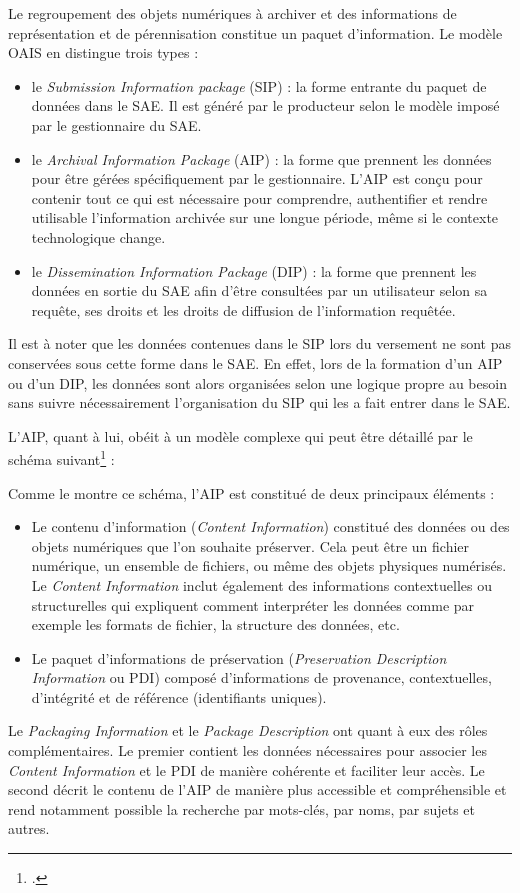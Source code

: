 Le regroupement des objets numériques à archiver et des informations de représentation et de pérennisation constitue un paquet d'information. Le modèle \gls{OAIS} en distingue trois types : 
\begin{itemize}
	\item le \textit{Submission Information package} (\gls{SIP}) : la forme entrante du paquet de données dans le \gls{SAE}. Il est généré par le producteur selon le modèle imposé par le gestionnaire du \gls{SAE}.
	\item le \textit{Archival Information Package} (\gls{AIP}) : la forme que prennent les données pour être gérées spécifiquement par le gestionnaire. L'\gls{AIP} est conçu pour contenir tout ce qui est nécessaire pour comprendre, authentifier et rendre utilisable l'information archivée sur une longue période, même si le contexte technologique change.
	\item le \textit{Dissemination Information Package} (\gls{DIP}) : la forme que prennent les données en sortie du \gls{SAE} afin d’être consultées par un utilisateur selon sa requête, ses droits et les droits de diffusion de l’information requêtée.
\end{itemize}


Il est à noter que les données contenues dans le \gls{SIP} lors du versement ne sont pas conservées sous cette forme dans le \gls{SAE}. En effet, lors de la formation d’un \gls{AIP} ou d’un \gls{DIP}, les données sont alors organisées selon une logique propre au besoin sans suivre nécessairement l’organisation du \gls{SIP} qui les a fait entrer dans le \gls{SAE}. 


L’\gls{AIP}, quant à lui, obéit à un modèle complexe qui peut être détaillé par le schéma suivant\footcite[p.80]{noauthor_reference_2012} : 


Comme le montre ce schéma, l’\gls{AIP} est constitué de deux principaux éléments :
\begin{itemize}
	\item Le contenu d'information (\textit{Content Information}) constitué des données ou des objets numériques que l'on souhaite préserver. Cela peut être un fichier numérique, un ensemble de fichiers, ou même des objets physiques numérisés. Le \textit{Content Information} inclut également des informations contextuelles ou structurelles qui expliquent comment interpréter les données comme par exemple les formats de fichier, la structure des données, etc.
	\item Le paquet d'informations de préservation (\textit{Preservation Description Information} ou PDI) composé d’informations de provenance, contextuelles, d’intégrité et de référence (identifiants uniques).
\end{itemize}
Le \textit{Packaging Information} et le \textit{Package Description} ont quant à eux des rôles complémentaires. Le premier contient les données nécessaires pour associer les \textit{Content Information} et le PDI de manière cohérente et faciliter leur accès. Le second décrit le contenu de l'\gls{AIP} de manière plus accessible et compréhensible et rend notamment possible la recherche par mots-clés, par noms, par sujets et autres.


